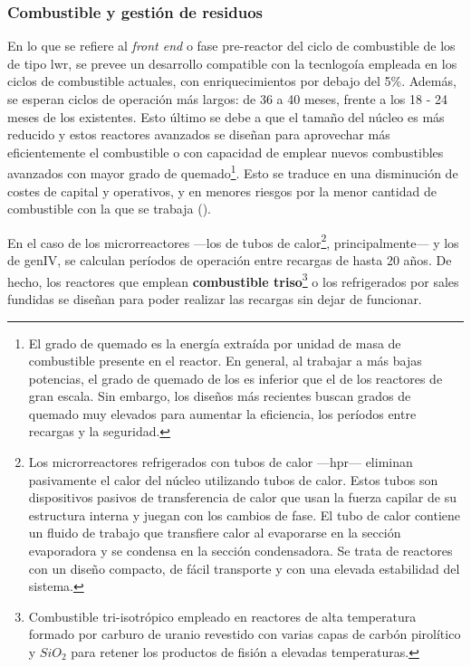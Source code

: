 \newpage
\subsubsection{Combustible y gestión de residuos} \label{combustible}

En lo que se refiere al \emph{front end} o fase pre-reactor del ciclo de combustible de los  de tipo \acrshort{lwr}, se prevee un desarrollo compatible con la tecnlogoía empleada en los ciclos de combustible actuales, con enriquecimientos  por debajo del 5\%. Además, se esperan ciclos de operación más largos: de 36 a 40 meses, frente a los 18 - 24 meses de los  existentes. Esto último se debe a que el tamaño del núcleo es más reducido y estos reactores avanzados se diseñan para aprovechar más eficientemente el combustible o con capacidad de emplear nuevos combustibles avanzados con mayor \gls{grado de quemado}\footnote{El grado de quemado es la energía extraída por unidad de masa de combustible presente en el reactor. En general, al trabajar a más bajas potencias, el grado de quemado de los  es inferior que el de los reactores de gran escala. Sin embargo, los diseños más recientes buscan grados de quemado muy elevados para aumentar la eficiencia, los períodos entre recargas y la seguridad.}. Esto se traduce en una disminución de costes de capital y operativos, y en menores riesgos por la menor cantidad de combustible con la que se trabaja (\cite{overview_smrs}).

En el caso de los microrreactores ---los de \gls{tubos de calor}\footnote{Los microrreactores refrigerados con tubos de calor ---\acrfull{hpr}--- eliminan pasivamente el calor del núcleo  utilizando tubos de calor. Estos tubos son dispositivos pasivos de transferencia de calor que usan la fuerza capilar de su estructura interna y juegan con los cambios de fase. El tubo de calor contiene un fluido de trabajo que transfiere calor al evaporarse en la sección evaporadora y se condensa en la sección condensadora. Se trata de reactores con un diseño compacto, de fácil transporte y con una elevada estabilidad del sistema.}, principalmente--- y los  de \acrshort{genIV}, se calculan períodos de operación entre recargas de hasta 20 años. De hecho, los reactores que emplean \textbf{\gls{combustible} \acrshort{triso}}\footnote{Combustible tri-isotrópico empleado en reactores de alta temperatura formado por carburo de uranio revestido con varias capas de carbón pirolítico y $SiO_2$ para retener los productos de fisión a elevadas temperaturas.} o los refrigerados por sales fundidas se diseñan para poder realizar las recargas sin dejar de funcionar.

